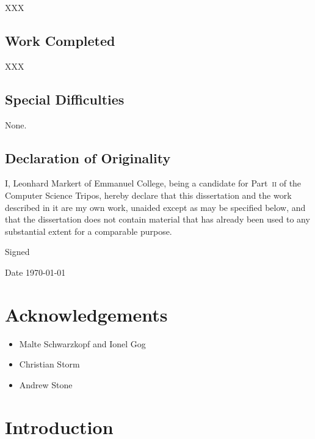 \documentclass[11pt,chapterprefix=true,toc=bibliography,numbers=noendperiod]{scrreprt}
\begin{document}
XXX

\section*{Work Completed\label{sc:work-completed}}

XXX

\section*{Special Difficulties\label{sc:special-difficulties}}

None.

\section*{Declaration of Originality\label{sc:declaration-of-originality}}

I, Leonhard Markert of Emmanuel College, being a candidate for Part~\textsc{ii} of the Computer Science Tripos, hereby declare that this dissertation and the work described in it are my own work, unaided except as may be specified below, and that the dissertation does not contain material that has already been used to any substantial extent for a comparable purpose.

\vspace{0.3in}
Signed

\vspace{0.2in}
Date \hspace{0.4in} \today

\chapter*{Acknowledgements\label{ch:acknowledgements}}

\begin{itemize}
    \item Malte Schwarzkopf and Ionel Gog
    \item Christian Storm
    \item Andrew Stone
\end{itemize}

\tableofcontents

\chapter{Introduction\label{ch:introduction}}

\end{document}
